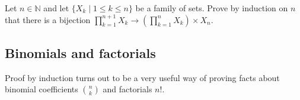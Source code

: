 \begin{exercise}
Let $n \in \mathbb{N}$ and let $\{ X_k \mid 1 \le k \le n \}$ be a family of sets. Prove by induction on $n$ that there is a bijection $\displaystyle \prod_{k=1}^{n+1} X_k \to \left( \prod_{k=1}^n X_k \right) \times X_n$.
\end{exercise}

\subsection*{Binomials and factorials}

Proof by induction turns out to be a very useful way of proving facts about binomial coefficients $\binom{n}{k}$ and factorials $n!$.

